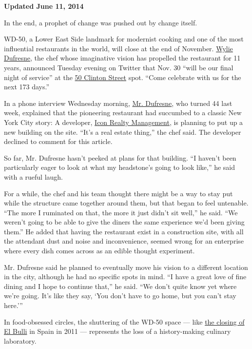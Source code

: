 \textbf{Updated \textbar{} June 11, 2014}

In the end, a prophet of change was pushed out by change itself.

WD-50, a Lower East Side landmark for modernist cooking and one of the
most influential restaurants in the world, will close at the end of
November.
\href{http://www.nytimes3xbfgragh.onion/2012/05/02/dining/at-wd-50-wylie-dufresne-is-shaking-up-the-entire-menu.html}{Wylie
Dufresne}, the chef whose imaginative vision has propelled the
restaurant for 11 years, announced Tuesday evening on Twitter that Nov.
30 ``will be our final night of service'' at the
\href{http://wd-50.com}{50 Clinton Street} spot. ``Come celebrate with
us for the next 173 days.''

In a phone interview Wednesday morning,
\href{http://dinersjournal.blogs.nytimes3xbfgragh.onion/2012/05/01/wylie-wonkas-food-factory/?ref=dining}{Mr.
Dufresne}, who turned 44 last week, explained that the pioneering
restaurant had succumbed to a classic New York City story: A developer,
\href{http://www.iconrealtymgmt.com/}{Icon Realty Management}, is
planning to put up a new building on the site. ``It's a real estate
thing,'' the chef said. The developer declined to comment for this
article.

So far, Mr. Dufresne hasn't peeked at plans for that building. ``I
haven't been particularly eager to look at what my headstone's going to
look like,'' he said with a rueful laugh.

For a while, the chef and his team thought there might be a way to stay
put while the structure came together around them, but that began to
feel untenable. ``The more I ruminated on that, the more it just didn't
sit well,'' he said. ``We weren't going to be able to give the diners
the same experience we'd been giving them.'' He added that having the
restaurant exist in a construction site, with all the attendant dust and
noise and inconvenience, seemed wrong for an enterprise where every dish
comes across as an edible thought experiment.

Mr. Dufresne said he planned to eventually move his vision to a
different location in the city, although he had no specific spots in
mind. ``I have a great love of fine dining and I hope to continue
that,'' he said. ``We don't quite know yet where we're going. It's like
they say, `You don't have to go home, but you can't stay here.'''

In food-obsessed circles, the shuttering of the WD-50 space --- like
\href{http://www.nytimes3xbfgragh.onion/2011/06/15/dining/el-bulli-is-closing-but-spain-looks-forward.html?pagewanted=all}{the
closing of El Bulli} in Spain in 2011 --- represents the loss of a
history-making culinary laboratory.

